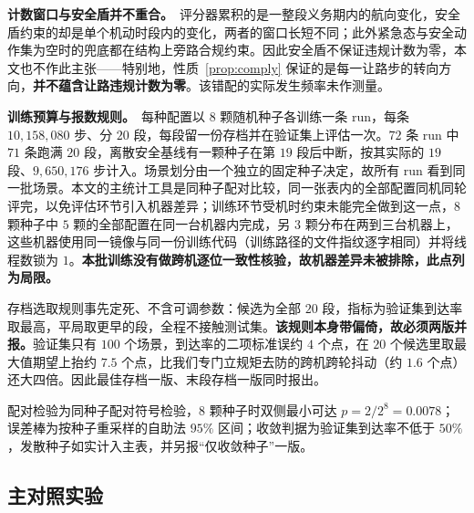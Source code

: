 \documentclass[12pt,letterpaper]{article}
\begin{document}
\textbf{计数窗口与安全盾并不重合。}\ 评分器累积的是一整段义务期内的航向变化，安全盾约束的却是单个机动时段内的变化，两者的窗口长短不同；此外紧急态与安全动作集为空时的兜底都在结构上旁路合规约束。因此安全盾不保证违规计数为零，本文也不作此主张——特别地，性质~\ref{prop:comply} 保证的是每一让路步的转向方向，\textbf{并不蕴含让路违规计数为零}。该错配的实际发生频率未作测量。

\textbf{训练预算与报数规则。}\ 
每种配置以 $8$ 颗随机种子各训练一条 run，每条 $10{,}158{,}080$ 步、分 $20$ 段，每段留一份存档并在验证集上评估一次。$72$ 条 run 中 $71$ 条跑满 $20$ 段，离散安全基线有一颗种子在第 $19$ 段后中断，按其实际的 $19$ 段、$9{,}650{,}176$ 步计入。场景划分由一个独立的固定种子决定，故所有 run 看到同一批场景。本文的主统计工具是同种子配对比较，同一张表内的全部配置同机同轮评完，以免评估环节引入机器差异；训练环节受机时约束未能完全做到这一点，$8$ 颗种子中 $5$ 颗的全部配置在同一台机器内完成，另 $3$ 颗分布在两到三台机器上，这些机器使用同一镜像与同一份训练代码（训练路径的文件指纹逐字相同）并将线程数锁为 $1$。\textbf{本批训练没有做跨机逐位一致性核验，故机器差异未被排除，此点列为局限。}

存档选取规则事先定死、不含可调参数：候选为全部 $20$ 段，指标为验证集到达率取最高，平局取更早的段，全程不接触测试集。\textbf{该规则本身带偏倚，故必须两版并报。}验证集只有 $100$ 个场景，到达率的二项标准误约 $4$ 个点，在 $20$ 个候选里取最大值期望上抬约 $7.5$ 个点，比我们专门立规矩去防的跨机跨轮抖动（约 $1.6$ 个点）还大四倍。因此最佳存档一版、末段存档一版同时报出。


配对检验为同种子配对符号检验，$8$ 颗种子时双侧最小可达 $p=2/2^{8}=0.0078$；误差棒为按种子重采样的自助法 $95\%$ 区间；收敛判据为验证集到达率不低于 $50\%$，发散种子如实计入主表，并另报“仅收敛种子”一版。\label{sec:stats}

\subsection{主对照实验}
\label{sec:results}
\label{sec:res-main}
\end{document}

